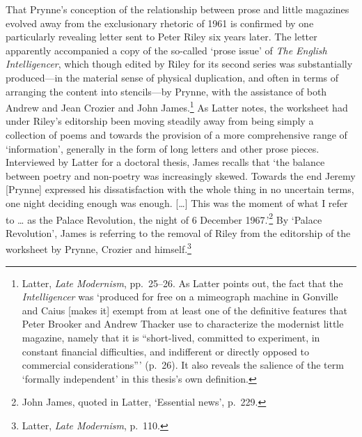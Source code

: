 \documentclass[]{article}
\begin{document}
That Prynne’s conception of the relationship between prose and little
magazines evolved away from the exclusionary rhetoric of 1961 is
confirmed by one particularly revealing letter sent to Peter Riley six
years later. The letter apparently accompanied a copy of the so-called
‘prose issue’ of \emph{The English Intelligencer}, which though edited
by Riley for its second series was substantially produced—in the
material sense of physical duplication, and often in terms of arranging
the content into stencils—by Prynne, with the assistance of both Andrew
and Jean Crozier and John James.\footnote{Latter, \emph{Late Modernism},
  pp.~25–26. As Latter points out, the fact that the
  \emph{Intelligencer} was ‘produced for free on a mimeograph machine in
  Gonville and Caius {[}makes it{]} exempt from at least one of the
  definitive features that Peter Brooker and Andrew Thacker use to
  characterize the modernist little magazine, namely that it is
  “short-lived, committed to experiment, in constant financial
  difficulties, and indifferent or directly opposed to commercial
  considerations”’ (p.~26). It also reveals the salience of the term
  ‘formally independent’ in this thesis’s own definition.} As Latter
notes, the worksheet had under Riley’s editorship been moving steadily
away from being simply a collection of poems and towards the provision
of a more comprehensive range of ‘information’, generally in the form of
long letters and other prose pieces. Interviewed by Latter for a
doctoral thesis, James recalls that ‘the balance between poetry and
non-poetry was increasingly skewed. Towards the end Jeremy {[}Prynne{]}
expressed his dissatisfaction with the whole thing in no uncertain
terms, one night deciding enough was enough. {[}\ldots{}{]} This was the
moment of what I refer to \ldots{} as the Palace Revolution, the night
of 6 December 1967.’\footnote{John James, quoted in Latter, ‘Essential
  news’, p.~229.} By ‘Palace Revolution’, James is referring to the
removal of Riley from the editorship of the worksheet by Prynne, Crozier
and himself.\footnote{Latter, \emph{Late Modernism}, p.~110.}
\end{document}
